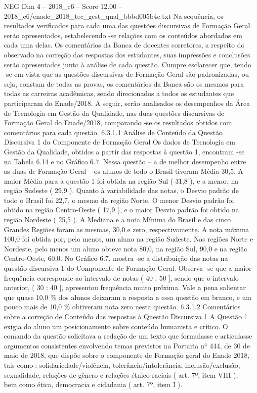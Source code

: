 \begin{textsample}{NEG Dim 4 – 2018\_c6 – Score 12.00 – 2018\_c6/enade\_2018\_tec\_gest\_qual\_bbbd005b4c.txt}
Na sequência, os resultados verificados para cada uma das questões discursivas de Formação Geral serão apresentados, estabelecendo -se relações com os conteúdos abordados em cada uma delas.
Os comentários da Banca de docentes corretores, a respeito do observado na correção das respostas dos estudantes, suas impressões e conclusões serão apresentados junto à análise de cada questão.
Cumpre esclarecer que, tendo -se em vista que as questões discursivas de Formação Geral são padronizadas, ou seja, constam de todas as provas, os comentários da Banca são os mesmos para todas as carreiras acadêmicas, sendo direcionados a todos os estudantes que participaram do Enade/2018.
A seguir, serão analisados os desempenhos da Área de Tecnologia em Gestão da Qualidade, nas duas questões discursivas de Formação Geral do Enade/2018, comparando -se os resultados obtidos com comentários para cada questão. 6.3.1.1 Análise de Conteúdo da Questão Discursiva 1 do Componente de Formação Geral Os dados de Tecnologia em Gestão da Qualidade, obtidos a partir das respostas à questão 1, encontram -se na Tabela 6.14 e no Gráfico 6.7.
Nessa questão – a de melhor desempenho entre as duas de Formação Geral – os alunos de todo o Brasil tiveram Média 30,5.
A maior Média para a questão 1 foi obtida na região Sul ( 31,8 ), e a menor, na região Sudeste ( 29,9 ).
Quanto à variabilidade das notas, o Desvio padrão de todo o Brasil foi 22,7, o mesmo da região Norte.
O menor Desvio padrão foi obtido na região Centro-Oeste ( 17,9 ), e o maior Desvio padrão foi obtido na região Nordeste ( 25,5 ).
A Mediana e a nota Mínima do Brasil e das cinco Grandes Regiões foram as mesmas, 30,0 e zero, respectivamente.
A nota máxima 100,0 foi obtida por, pelo menos, um aluno na região Sudeste.
Nas regiões Norte e Nordeste, pelo menos um aluno obteve nota 80,0, na região Sul, 90,0 e na região Centro-Oeste, 60,0.
No Gráfico 6.7, mostra -se a distribuição das notas na questão discursiva 1 do Componente de Formação Geral.
Observa -se que a maior frequência corresponde ao intervalo de notas ( 40 ; 50 ], sendo que o intervalo anterior, ( 30 ; 40 ], apresentou frequência muito próxima.
Vale a pena salientar que quase 10,0 \% dos alunos deixaram a resposta a essa questão em branco, e um pouco mais de 10,0 \% obtiveram nota zero nesta questão. 6.3.1.2 Comentários sobre a correção de Conteúdo das respostas à Questão Discursiva 1 A Questão 1 exigia do aluno um posicionamento sobre conteúdo humanista e crítico.
O comando da questão solicitava a redação de um texto que formulasse e articulasse argumentos consistentes envolvendo temas previstos na Portaria nº 444, de 30 de maio de 2018, que dispõe sobre o componente de Formação geral do Enade 2018, tais como : solidariedade/violência, tolerância/intolerância, inclusão/exclusão, sexualidade, relações de gênero e relações étnico-raciais ( art. 7º, item VIII ), bem como ética, democracia e cidadania ( art. 7º, item I ).

\end{textsample}

